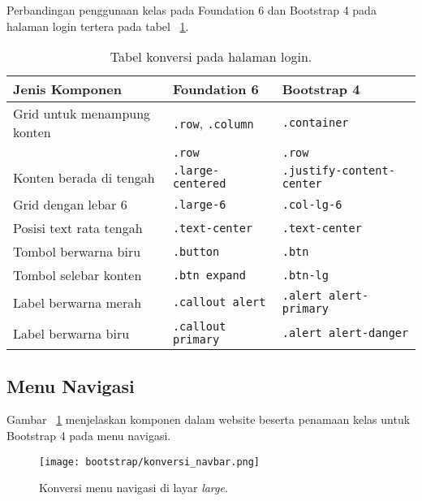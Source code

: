 \noindent Perbandingan penggunaan kelas pada Foundation 6 dan Bootstrap 4 pada halaman login tertera pada tabel ~\ref{table:konversiLogin}.\\
\begin{table}[H]
	\caption{Tabel konversi pada halaman login.}
	\begin{tabular}{| p{} | p{} | p{} |} 
		\hline
		\textbf{Jenis Komponen} & \textbf{Foundation 6} & \textbf{Bootstrap 4}  \\ [0.5ex] 
		\hline
		Grid untuk menampung konten & \texttt{.row}, \texttt{.column} &\texttt{.container}    \\	
		& \texttt{.row} &\texttt{.row}     \\  
		\hline
		Konten berada di tengah &\texttt{.large-centered} &\texttt{.justify-content-center} \\  
		\hline
		Grid dengan lebar 6 &\texttt{.large-6} &\texttt{.col-lg-6}    \\ 
		\hline
		Posisi text rata tengah  &\texttt{.text-center} & \texttt{.text-center }  \\ 
		\hline
		Tombol berwarna biru &\texttt{.button} & \texttt{.btn}   \\ 
		\hline
		Tombol selebar konten & \texttt{.btn expand} & \texttt{.btn-lg}  \\ 
		\hline
		Label berwarna merah & \texttt{.callout alert} & \texttt{.alert alert-primary}  \\ 
		\hline
		Label berwarna biru & \texttt{.callout primary} & \texttt{.alert alert-danger}  \\ [1ex]
		\hline
	\end{tabular}
	\label{table:konversiLogin}
\end{table}


\subsection{Menu Navigasi}
\noindent Gambar ~\ref{fig:konversiNavigasi} menjelaskan komponen dalam website beserta penamaan kelas untuk Bootstrap 4 pada menu navigasi.\\
\begin{figure} [H]
	\centering  
	\texttt{[image: bootstrap/konversi\_navbar.png]}  
	\caption{Konversi menu navigasi di layar \textit{large}.} 
	\label{fig:konversiNavigasi}
\end{figure}

